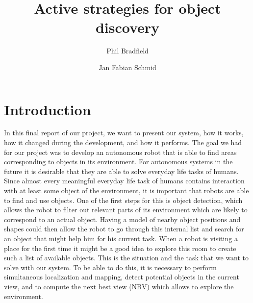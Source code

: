 \documentclass[a4paper,11pt,english]{article}
\begin{document}
\title{Active strategies for object discovery}
\author{Phil Bradfield \and Jan Fabian Schmid}
	
\maketitle 

\section{Introduction}
\label{Introduction}

In this final report of our project, we want to present our system, how it works, how it changed during the development, and how it performs.
The goal we had for our project was to develop an autonomous robot that is able to find areas corresponding to objects in its environment.
For autonomous systems in the future it is desirable that they are able to solve everyday life tasks of humans.
Since almost every meaningful everyday life task of humans contains interaction with at least some object of the environment, it is important that robots are able to find and use objects.
One of the first steps for this is object detection, which allows the robot to filter out relevant parts of its environment which are likely to correspond to an actual object. Having a model of nearby object positions and shapes could then allow the robot to go through this internal list and search for an object that might help him for his current task.
When a robot is visiting a place for the first time it might be a good idea to explore this room to create such a list of available objects.
This is the situation and the task that we want to solve with our system.
To be able to do this, it is necessary to perform simultaneous localization and mapping, detect potential objects in the current view, and to compute the next best view (NBV) which allows to explore the environment.
\end{document}

